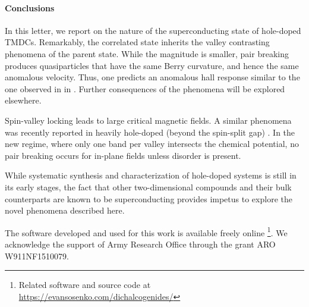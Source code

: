 \paragraph{Conclusions}

In this letter, we report on the nature of the superconducting state
of hole-doped TMDCs.
Remarkably, the correlated state inherits
the valley contrasting phenomena of the parent state.
While the magnitude is smaller, pair breaking produces quasiparticles
that have the same Berry curvature, and hence the same anomalous velocity.
Thus, one predicts an anomalous hall response similar to
the one observed in in .
Further consequences of the phenomena will be explored elsewhere.

Spin-valley locking leads to large critical magnetic fields.
A similar phenomena was recently reported in heavily hole-doped
(beyond the spin-split gap) .
In the new regime, where only one band per valley intersects
the chemical potential, no pair breaking occurs
for in-plane fields unless disorder is present.

While systematic synthesis and characterization of hole-doped systems
is still in its early stages, the fact that other two-dimensional compounds
and their bulk counterparts are known to be superconducting
provides impetus to explore the novel phenomena described here.

The software developed and used for this work
is available freely online
\footnote{%
  Related software and source code at \\
  \url{https://evansosenko.com/dichalcogenides/}
}.
We acknowledge the support of Army Research Office through the grant
ARO W911NF1510079.
